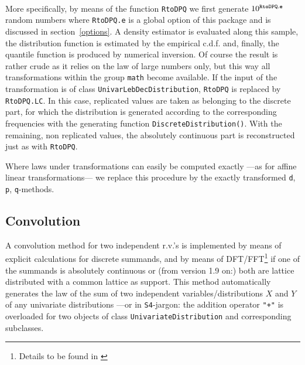 \documentclass[11pt]{article}
\newcommand{\code}[1]{{\tt #1}}
\begin{document}
\\
More specifically, by means of the function
\code{RtoDPQ} we first generate $10^{\footnotesize\tt RtoDPQ.e}$
random numbers where \code{RtoDPQ.e} is a global option of this package and is
discussed in section~{\ref{options}}. %
A density estimator is evaluated along this sample, the distribution function is
estimated by the empirical c.d.f. and, finally, the quantile function is
produced by numerical inversion.
Of course the result is rather crude as it relies on the law of large numbers
only, but this way all transformations within the group \code{math} become
available.
If the input of the transformation is of class \code{UnivarLebDecDistribution},
\code{RtoDPQ} is replaced by \code{RtoDPQ.LC}. In this case, replicated values
are taken as belonging to the discrete part, for which the distribution is
generated according to the corresponding frequencies with the generating
function \code{DiscreteDistribution()}. With the remaining, non replicated
values, the absolutely continuous part is reconstructed just as with \code{RtoDPQ}.

Where laws under transformations can easily be computed exactly ---as for affine
linear transformations--- we replace this procedure by the exactly transformed
\code{d}, \code{p}, \code{q}-methods.
%
\subsection{Convolution}
%
A convolution method for two independent r.v.'s is implemented by means
of explicit calculations for discrete summands, and by means of
DFT/FFT\footnote{Details to be found in \cite{K:R:S:04}} if one of the summands is
absolutely continuous or (from version 1.9 on:) both are lattice distributed
with a common lattice as support.
This method automatically generates the law of the sum of two independent
variables/distributions $X$ and $Y$ of any univariate distributions ---or
in {\tt S4}-jargon: the addition operator \code{"+"} is overloaded for two
objects of class \code{UnivariateDistribution} and corresponding subclasses.
%
\end{document}
